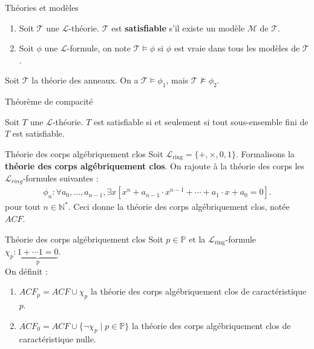 \documentclass{beamer}
\begin{document}
\begin{frame}{Théories et modèles}
\begin{definition}
\begin{enumerate}
\item Soit $\mathcal{T}$ une $\mathcal{L}$-théorie. $\mathcal{T}$ est \textbf{satisfiable} s'il existe un modèle $\mathcal{M}$ de $\mathcal{T}$.
\item Soit $\phi$ une $\mathcal{L}$-formule, on note $\mathcal{T} \models \phi$ si $\phi$ est vraie dans tous les modèles de $\mathcal{T}$.
\end{enumerate}
\end{definition}
\begin{example}
Soit $\mathcal{T}$ la théorie des anneaux. On a $\mathcal{T} \models \phi_1$, mais $\mathcal{T} \not\models \phi_2$.
\end{example}
\end{frame}

\begin{frame}{Théorème de compacité}
\begin{theorem}
Soit $T$ une $\mathcal{L}$-théorie. $T$ est satisfiable si et seulement si tout sous-ensemble fini de $T$ est satisfiable.
\end{theorem}
\end{frame}

\begin{frame}{Théorie des corps algébriquement clos}
Soit $\mathcal{L}_{\text{ring}} = \{+, \times, 0, 1\}$. Formalisons la \textbf{théorie des corps algébriquement clos}.
On rajoute à la théorie des corps les $\mathcal{L}_{ring}$-formules suivantes :
\begin{align*}
 \phi_n : \forall a_0, \ldots, a_{n-1}, \exists x [x^n+a_{n-1}\cdot x^{n-1} + \cdots + a_1 \cdot x + a_0 = 0].
\end{align*}
pour tout $n \in \mathbb{N^*}$. Ceci donne la théorie des corps algébriquement clos, notée $ACF$.
\end{frame}

\begin{frame}{Théorie des corps algébriquement clos}
Soit $p \in \mathbb{P}$ et la $\mathcal{L}_{\text{ring}}$-formule $\chi_p : \underbrace{1 + \cdots 1 = 0}_\text{p}$.\\On définit :
\begin{enumerate}
\item $ACF_p = ACF \cup \chi_p$ la théorie des corps algébriquement clos de caractéristique $p$.
\item $ACF_0 = ACF \cup \{\neg\chi_p \mid p \in \mathbb{P}\}$ la théorie des corps algébriquement clos de caractéristique nulle.
\end{enumerate}
\end{frame}
\end{document}
